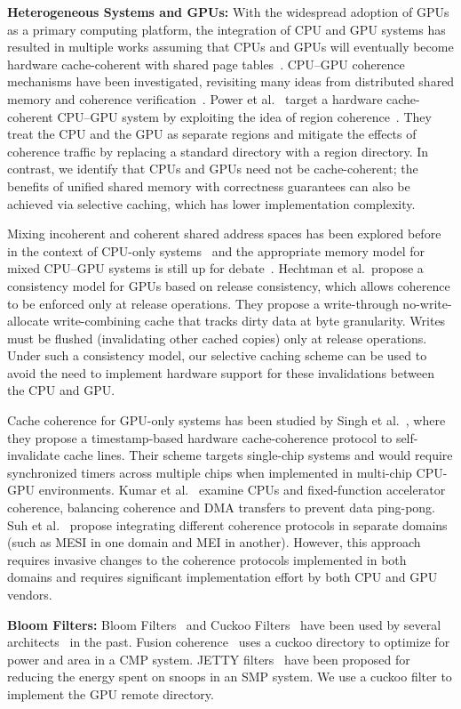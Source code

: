 \textbf{Heterogeneous Systems and GPUs:} With the widespread adoption of GPUs as
a primary computing platform, the integration of CPU and GPU systems has
resulted in multiple works assuming that CPUs and GPUs will eventually become
hardware cache-coherent with shared page
tables~\cite{Power2014,Pichai2014,Agarwal2015,Agarwal2015b}.  CPU--GPU coherence
mechanisms have been investigated, revisiting many ideas from distributed shared
memory and coherence
verification~\cite{Gelado2010,Power2013,wu2014,Kaxiras2013}. Power et
al.~\cite{Power2013} target a hardware cache-coherent CPU--GPU system by
exploiting the idea of region
coherence~\cite{Cantin2005,Alisafaee2012,Moshovos2005,Zebchuk2007}. They treat
the CPU and the GPU as separate regions and mitigate the effects of coherence
traffic by replacing a standard directory with a region directory.  In contrast,
we identify that CPUs and GPUs need not be cache-coherent; the benefits of
unified shared memory with correctness guarantees can also be achieved via
selective caching, which has lower implementation complexity.

Mixing incoherent and coherent shared address spaces has been explored before in
the context of CPU-only systems~\cite{Huh04} and the appropriate memory model
for mixed CPU--GPU systems is still up for
debate~\cite{Lim2012,Hechtman2014,Hower2014,Gaster2015}.  Hechtman et
al.~propose a consistency model for GPUs based on release consistency, which
allows coherence to be enforced only at release operations.  They propose a
write-through no-write-allocate write-combining cache that tracks dirty data at
byte granularity.  Writes must be flushed (invalidating other cached copies)
only at release operations.  Under such a consistency model, our selective
caching scheme can be used to avoid the need to implement hardware support for
these invalidations between the CPU and GPU.

Cache coherence for GPU-only systems has been studied by Singh et
al.~\cite{Singh2013}, where they propose a timestamp-based hardware
cache-coherence protocol to self-invalidate cache lines. Their scheme targets
single-chip systems and would require synchronized timers across multiple chips
when implemented in multi-chip CPU-GPU environments.  Kumar et
al.~\cite{Kumar2015} examine CPUs and fixed-function accelerator coherence,
balancing coherence and DMA transfers to prevent data ping-pong.  Suh et
al.~\cite{Suh2004} propose integrating different coherence protocols in separate
domains (such as MESI in one domain and MEI in another).  However, this approach
requires invasive changes to the coherence protocols implemented in both domains
and requires significant implementation effort by both CPU and GPU vendors.

\textbf{Bloom Filters:} Bloom Filters~\cite{Bloom1970} and Cuckoo
Filters~\cite{Pagh2004,fan2014} have been used by several
architects~\cite{Strauss2006,Zebchuk2009,Hongzhou2011} in the past. Fusion
coherence~\cite{wu2014} uses a cuckoo directory to optimize for power and area
in a CMP system. JETTY filters~\cite{Moshovos2001} have been proposed for
reducing the energy spent on snoops in an SMP system. We use a cuckoo filter to
implement the GPU remote directory.
